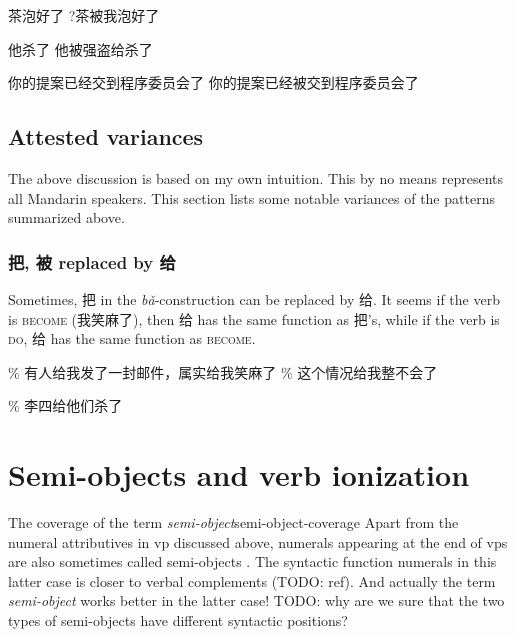 \documentclass[UTF8, a4paper, oneside, scheme=plain, 12pt]{ctexrep}
\newcommand*{\citepage}[1]{p.~{#1}}
\newcommand*{\term}[1]{\emph{#1}}
\newcommand{\form}[1]{\emph{#1}}
\newcommand*{\category}[1]{\textsc{#1}}
\begin{document}
\begin{exe}
    \ex\label{ex:verb-phrase.bei.notional-pass-conflict-1} \begin{xlist}
        \ex 茶泡好了
        \ex ?茶被我泡好了
    \end{xlist}
    \ex\label{ex:verb-phrase.bei.notional-pass-conflict-2} \begin{xlist}
        \ex *他杀了
        \ex 他被强盗给杀了
    \end{xlist}
    \ex\label{ex:verb-phrase.bei.notional-pass-conflict-3} \begin{xlist}
        \ex 你的提案已经交到程序委员会了
        \ex 你的提案已经被交到程序委员会了
    \end{xlist}
\end{exe}

\subsection{Attested variances}

The above discussion is based on my own intuition.
This by no means represents all Mandarin speakers. 
This section lists some notable variances of the patterns summarized above. 

\subsubsection{把, 被 replaced by 给}

Sometimes, 把 in the \form{bǎ}-construction can be replaced by 给.
It seems if the verb is \category{become} (我笑麻了),
then 给 has the same function as 把's, 
while if the verb is \category{do},
给 has the same function as \category{become}.

\begin{exe}
    \ex \% 有人给我发了一封邮件，属实给我笑麻了
    \ex \% 这个情况给我整不会了
\end{exe}

\begin{exe}
    \ex\label{ex:verb-phrase.gei.2} \% 李四给他们杀了
\end{exe}


\section{Semi-objects and verb ionization}\label{sec:verb-splitting}



\begin{infobox}{The coverage of the term \term{semi-object}}{semi-object-coverage}
    Apart from the numeral attributives in \acs{vp} discussed above, 
    numerals appearing at the end of \acs{vp}s 
    are also sometimes called semi-objects \citep[\citepage{117}]{deng2010formal}.
    The syntactic function numerals in this latter case 
    is closer to verbal complements (TODO: ref).
    And actually the term \term{semi-object} works better in the latter case!
    TODO: why are we sure that the two types of semi-objects have different syntactic positions?
\end{infobox}
\end{document}

